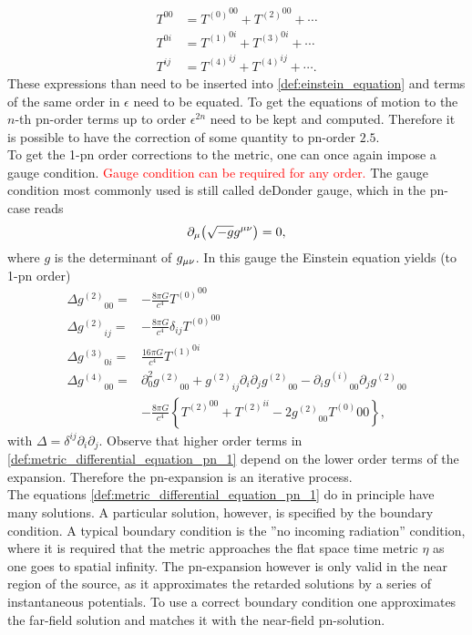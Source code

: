 \begin{align}\label{def:pn_expansion_energy_momentum_tensor}
T^{00} & = {T^{(0)}}^{00}+{T^{(2)}}^{00}+\cdots\nonumber\\
T^{0i} & = {T^{(1)}}^{0i}+{T^{(3)}}^{0i}+\cdots\\
T^{ij} & = {T^{(4)}}^{ij}+{T^{(4)}}^{ij}+\cdots.\nonumber
\end{align}
These expressions than need to be inserted into \eqref{def:einstein_equation} and terms of the same order in $\epsilon$ need to be equated. To get the equations of motion to the $n$-th \gls{pn}-order terms up to order $\epsilon^{2n}$ need to be kept and computed. Therefore it is possible to have the correction of some quantity to \gls{pn}-order $2.5$.\\
To get the 1-\gls{pn} order corrections to the metric, one can once again impose a gauge condition. \textcolor{red}{Gauge condition can be required for any order.} The gauge condition most commonly used is still called deDonder gauge, which in the \gls{pn}-case reads
\begin{equation}
\partial_\mu{\left( \sqrt{-g}g^{\mu\nu}\right)}=0,
\end{equation}
where $g$ is the determinant of $g_{\mu\nu}$. In this gauge the Einstein equation yields (to 1-\gls{pn} order)
\begin{align}\label{def:metric_differential_equation_pn_1}
\Delta {g^{(2)}}_{00} = & -\frac{8\pi G}{c^4}{T^{(0)}}^{00}\nonumber\\
\Delta {g^{(2)}}_{ij} = & -\frac{8\pi G}{c^4}\delta_{ij}{T^{(0)}}^{00}\nonumber\\
\Delta {g^{(3)}}_{0i} = & \frac{16\pi G}{c^4}{T^{(1)}}^{0i}\\
\Delta {g^{(4)}}_{00} = & \partial_0^2{g^{(2)}}_{00} + {g^{(2)}}_{ij}\partial_i\partial_j{g^{(2)}}_{00}-\partial_i{g^{(i)}}_{00}\partial_j{g^{(2)}}_{00}\nonumber\\
& -\frac{8\pi G}{c^4}\left\{{T^{(2)}}^{00}+{T^{(2)}}^{ii}-2{g^{(2)}}_{00}{T^{(0)}}{00}\right\},\nonumber
\end{align}
with $\Delta = \delta^{ij}\partial_i\partial_j$. Observe that higher order terms in \eqref{def:metric_differential_equation_pn_1} depend on the lower order terms of the expansion. Therefore the \gls{pn}-expansion is an iterative process.\\
The equations \eqref{def:metric_differential_equation_pn_1} do in principle have many solutions. A particular solution, however, is specified by the boundary condition. A typical boundary condition is the ''no incoming radiation'' condition, where it is required that the metric approaches the flat space time metric $\eta$ as one goes to spatial infinity. The \gls{pn}-expansion however is only valid in the near region of the source, as it approximates the retarded solutions by a series of instantaneous potentials. To use a correct boundary condition one approximates the far-field solution and matches it with the near-field \gls{pn}-solution.\\
